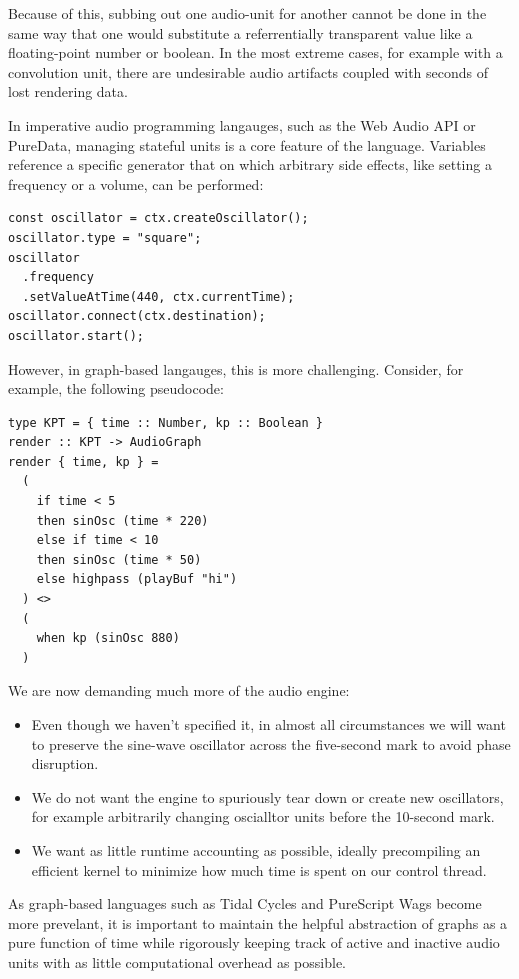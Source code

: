 \documentclass{article}
\begin{document}
Because of this, subbing out one audio-unit for another cannot be done in the same way that one would substitute a referrentially transparent value like a floating-point number or boolean. In the most extreme cases, for example with a convolution unit, there are undesirable audio artifacts coupled with seconds of lost rendering data.

In imperative audio programming langauges, such as the Web Audio API or PureData, managing stateful units is a core feature of the language. Variables reference a specific generator that on which arbitrary side effects, like setting a frequency or a volume, can be performed:

\lstset{language=Java, style=psstyle}
\begin{lstlisting}
const oscillator = ctx.createOscillator();
oscillator.type = "square";
oscillator
  .frequency
  .setValueAtTime(440, ctx.currentTime);
oscillator.connect(ctx.destination);
oscillator.start();
\end{lstlisting}

However, in graph-based langauges, this is more challenging. Consider, for example, the following pseudocode:

\lstset{language=Haskell, style=psstyle}
\begin{lstlisting}
type KPT = { time :: Number, kp :: Boolean }
render :: KPT -> AudioGraph
render { time, kp } =
  (
    if time < 5
    then sinOsc (time * 220)
    else if time < 10
    then sinOsc (time * 50)
    else highpass (playBuf "hi")
  ) <>
  (
    when kp (sinOsc 880)
  )
\end{lstlisting}

We are now demanding much more of the audio engine:
\begin{itemize}
\item Even though we haven't specified it, in almost all circumstances we will want to preserve the sine-wave oscillator across the five-second mark to avoid phase disruption.
\item We do not want the engine to spuriously tear down or create new oscillators, for example arbitrarily changing oscialltor units before the 10-second mark.
\item We want as little runtime accounting as possible, ideally precompiling an efficient kernel to minimize how much time is spent on our control thread.
\end{itemize}

As graph-based languages such as Tidal Cycles and PureScript Wags become more prevelant, it is important to maintain the helpful abstraction of graphs as a pure function of time while rigorously keeping track of active and inactive audio units with as little computational overhead as possible.
\end{document}
